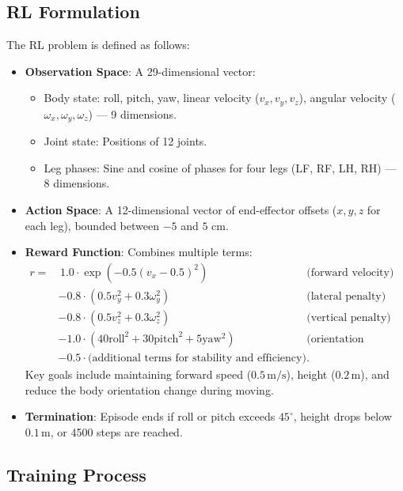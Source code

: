 \documentclass[a4paper,11pt]{article}
\begin{document}
\subsection{RL Formulation}

The RL problem is defined as follows:

\begin{itemize}
    \item \textbf{Observation Space}: A 29-dimensional vector:
    \begin{itemize}
        \item Body state: roll, pitch, yaw, linear velocity (\(v_x, v_y, v_z\)), angular velocity (\(\omega_x, \omega_y, \omega_z\)) — 9 dimensions.
        \item Joint state: Positions of 12 joints.
        \item Leg phases: Sine and cosine of phases for four legs (LF, RF, LH, RH) — 8 dimensions.
    \end{itemize}
    \item \textbf{Action Space}: A 12-dimensional vector of end-effector offsets (\(x, y, z\) for each leg), bounded between \(-5\) and \(5\) cm.
    \item \textbf{Reward Function}: Combines multiple terms:
    \begin{align*}
			r = & \, 1.0 \cdot \exp(-0.5 (v_x - 0.5)^2) & \text{(forward velocity)} \\
					& - 0.8 \cdot (0.5 v_y^2 + 0.3 \omega_y^2) & \text{(lateral penalty)} \\
					& - 0.8 \cdot (0.5 v_z^2 + 0.3 \omega_z^2) & \text{(vertical penalty)} \\
					& - 1.0 \cdot (40 \text{roll}^2 + 30 \text{pitch}^2 + 5 \text{yaw}^2) & \text{(orientation penalty)} \\
					& - 0.5 \cdot \text{(additional terms for stability and efficiency)}.
    \end{align*}
    Key goals include maintaining forward speed (\(0.5 \, \text{m/s}\)), height (\(0.2 \, \text{m}\)), and reduce the body orientation change during moving.
    \item \textbf{Termination}: Episode ends if roll or pitch exceeds \(45^\circ\), height drops below \(0.1 \, \text{m}\), or 4500 steps are reached.
\end{itemize}

\subsection{Training Process}
\end{document}
